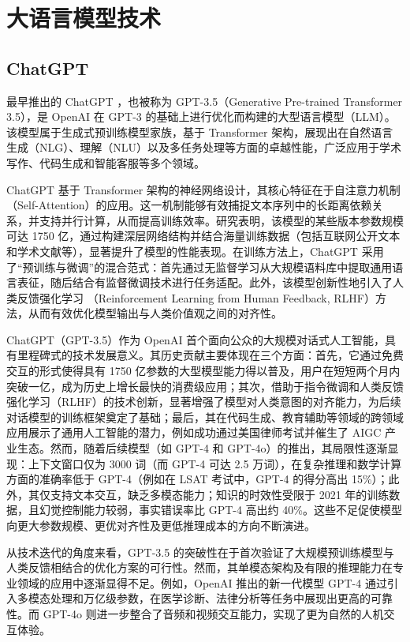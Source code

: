 \section{大语言模型技术}
\label{sec:rw-llm}

\subsection{ChatGPT}
\label{sec:TOSWT-gen-chatgpt}

最早推出的 ChatGPT \cite{chatgpt}，也被称为 GPT-3.5（Generative Pre-trained Transformer 3.5），是 OpenAI 在 GPT-3 的基础上进行优化而构建的大型语言模型（LLM）。该模型属于生成式预训练模型家族，基于 Transformer 架构，展现出在自然语言生成（NLG）、理解（NLU）以及多任务处理等方面的卓越性能，广泛应用于学术写作、代码生成和智能客服等多个领域。

ChatGPT 基于 Transformer 架构的神经网络设计，其核心特征在于自注意力机制（Self-Attention）的应用。这一机制能够有效捕捉文本序列中的长距离依赖关系，并支持并行计算，从而提高训练效率。研究表明，该模型的某些版本参数规模可达 1750 亿，通过构建深层网络结构并结合海量训练数据（包括互联网公开文本和学术文献等），显著提升了模型的性能表现。在训练方法上，ChatGPT 采用了“预训练与微调”的混合范式：首先通过无监督学习从大规模语料库中提取通用语言表征，随后结合有监督微调技术进行任务适配。此外，该模型创新性地引入了人类反馈强化学习 \cite{kaufmann2024surveyreinforcementlearninghuman}（Reinforcement Learning from Human Feedback, RLHF）方法，从而有效优化模型输出与人类价值观之间的对齐性。

ChatGPT（GPT-3.5）作为 OpenAI 首个面向公众的大规模对话式人工智能，具有里程碑式的技术发展意义。其历史贡献主要体现在三个方面：首先，它通过免费交互的形式使得具有 1750 亿参数的大型模型能力得以普及，用户在短短两个月内突破一亿，成为历史上增长最快的消费级应用；其次，借助于指令微调和人类反馈强化学习（RLHF）的技术创新，显著增强了模型对人类意图的对齐能力，为后续对话模型的训练框架奠定了基础；最后，其在代码生成、教育辅助等领域的跨领域应用展示了通用人工智能的潜力，例如成功通过美国律师考试并催生了 AIGC 产业生态。然而，随着后续模型（如 GPT-4 和 GPT-4o）的推出，其局限性逐渐显现：上下文窗口仅为 3000 词（而 GPT-4 可达 2.5 万词），在复杂推理和数学计算方面的准确率低于 GPT-4（例如在 LSAT 考试中，GPT-4 的得分高出 15\%）；此外，其仅支持文本交互，缺乏多模态能力；知识的时效性受限于 2021 年的训练数据，且幻觉控制能力较弱，事实错误率比 GPT-4 高出约 40\%。这些不足促使模型向更大参数规模、更优对齐性及更低推理成本的方向不断演进。

从技术迭代的角度来看，GPT-3.5 的突破性在于首次验证了大规模预训练模型与人类反馈相结合的优化方案的可行性。然而，其单模态架构及有限的推理能力在专业领域的应用中逐渐显得不足。例如，OpenAI 推出的新一代模型 GPT-4 通过引入多模态处理和万亿级参数，在医学诊断、法律分析等任务中展现出更高的可靠性。而 GPT-4o 则进一步整合了音频和视频交互能力，实现了更为自然的人机交互体验。


